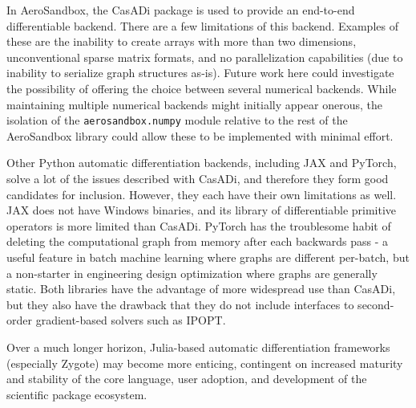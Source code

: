In AeroSandbox, the CasADi package is used to provide an end-to-end differentiable backend. There are a few limitations of this backend. Examples of these are the inability to create arrays with more than two dimensions, unconventional sparse matrix formats, and no parallelization capabilities (due to inability to serialize graph structures as-is). Future work here could investigate the possibility of offering the choice between several numerical backends. While maintaining multiple numerical backends might initially appear onerous, the isolation of the \texttt{aerosandbox.numpy} module relative to the rest of the AeroSandbox library could allow these to be implemented with minimal effort.

Other Python automatic differentiation backends, including JAX and PyTorch, solve a lot of the issues described with CasADi, and therefore they form good candidates for inclusion. However, they each have their own limitations as well. JAX does not have Windows binaries, and its library of differentiable primitive operators is more limited than CasADi. PyTorch has the troublesome habit of deleting the computational graph from memory after each backwards pass - a useful feature in batch machine learning where graphs are different per-batch, but a non-starter in engineering design optimization where graphs are generally static. Both libraries have the advantage of more widespread use than CasADi, but they also have the drawback that they do not include interfaces to second-order gradient-based solvers such as IPOPT.

Over a much longer horizon, Julia-based automatic differentiation frameworks (especially Zygote) may become more enticing, contingent on increased maturity and stability of the core language, user adoption, and development of the scientific package ecosystem.

%

%
%
